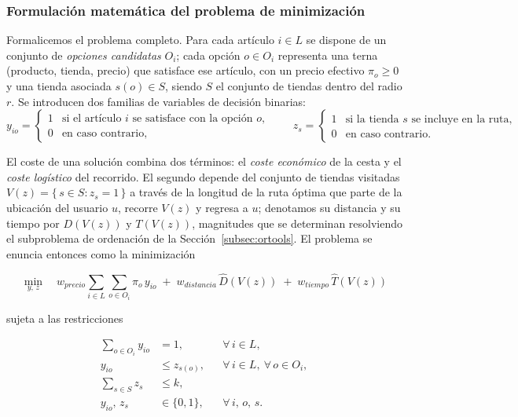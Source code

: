 \subsubsection*{Formulaci\'on matem\'atica del problema de minimizaci\'on}

Formalicemos el problema completo. Para cada art\'iculo $i \in L$ se dispone de un conjunto de
\emph{opciones candidatas} $O_i$; cada opci\'on $o \in O_i$ representa una terna
(producto, tienda, precio) que satisface ese art\'iculo, con un precio efectivo $\pi_o \ge 0$ y una
tienda asociada $s(o) \in S$, siendo $S$ el conjunto de tiendas dentro del radio $r$. Se introducen
dos familias de variables de decisi\'on binarias:
\[
  y_{io} =
  \begin{cases}
    1 & \text{si el art\'iculo } i \text{ se satisface con la opci\'on } o,\\
    0 & \text{en caso contrario,}
  \end{cases}
  \qquad
  z_{s} =
  \begin{cases}
    1 & \text{si la tienda } s \text{ se incluye en la ruta,}\\
    0 & \text{en caso contrario.}
  \end{cases}
\]

El coste de una soluci\'on combina dos t\'erminos: el \emph{coste econ\'omico} de la cesta y el
\emph{coste log\'istico} del recorrido. El segundo depende del conjunto de tiendas visitadas
$V(z) = \{\, s \in S : z_s = 1 \,\}$ a trav\'es de la longitud de la ruta \'optima que parte de la
ubicaci\'on del usuario $u$, recorre $V(z)$ y regresa a $u$; denotamos su distancia y su tiempo por
$D\!\left(V(z)\right)$ y $T\!\left(V(z)\right)$, magnitudes que se determinan resolviendo el
subproblema de ordenaci\'on de la Secci\'on~\ref{subsec:ortools}. El problema se enuncia entonces
como la minimizaci\'on

\begin{equation}\label{eq:objetivo-global}
  \min_{y,\,z}\quad
  w_{precio} \sum_{i \in L} \sum_{o \in O_i} \pi_o \, y_{io}
  \;+\; w_{distancia}\, \widehat{D}\!\left(V(z)\right)
  \;+\; w_{tiempo}\, \widehat{T}\!\left(V(z)\right)
\end{equation}

sujeta a las restricciones

\begin{align}
  \sum_{o \in O_i} y_{io} &= 1, & &\forall\, i \in L, \label{eq:c-asignacion}\\
  y_{io} &\le z_{s(o)}, & &\forall\, i \in L,\ \forall\, o \in O_i, \label{eq:c-enlace}\\
  \sum_{s \in S} z_s &\le k, & & \label{eq:c-paradas}\\
  y_{io},\, z_s &\in \{0,1\}, & &\forall\, i,\, o,\, s. \label{eq:c-binarias}
\end{align}

